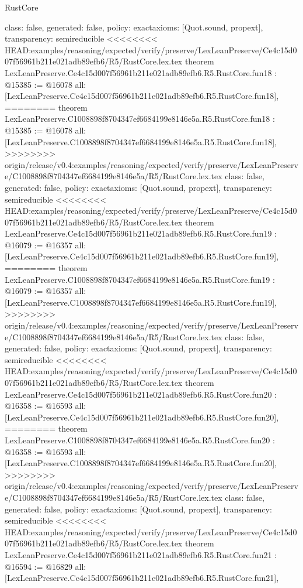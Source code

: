 \begin{lexlean}{RustCore}
\begin{coremodule}
{\begin{coremodule}
{{{{{{{{{{{{{{{{{{{{{  class: false,
  generated: false,
  policy: exact{axioms: [Quot.sound, propext]},
  transparency: semireducible
}
<<<<<<<< HEAD:examples/reasoning/expected/verify/preserve/LexLeanPreserve/Ce4c15d007f56961b211e021adb89efb6/R5/RustCore.lex.tex
theorem LexLeanPreserve.Ce4c15d007f56961b211e021adb89efb6.R5.RustCore.fun18 : @15385 := @16078 {
  all: [LexLeanPreserve.Ce4c15d007f56961b211e021adb89efb6.R5.RustCore.fun18],
========
theorem LexLeanPreserve.C1008898f8704347ef6684199e8146e5a.R5.RustCore.fun18 : @15385 := @16078 {
  all: [LexLeanPreserve.C1008898f8704347ef6684199e8146e5a.R5.RustCore.fun18],
>>>>>>>> origin/release/v0.4:examples/reasoning/expected/verify/preserve/LexLeanPreserve/C1008898f8704347ef6684199e8146e5a/R5/RustCore.lex.tex
  class: false,
  generated: false,
  policy: exact{axioms: [Quot.sound, propext]},
  transparency: semireducible
}
<<<<<<<< HEAD:examples/reasoning/expected/verify/preserve/LexLeanPreserve/Ce4c15d007f56961b211e021adb89efb6/R5/RustCore.lex.tex
theorem LexLeanPreserve.Ce4c15d007f56961b211e021adb89efb6.R5.RustCore.fun19 : @16079 := @16357 {
  all: [LexLeanPreserve.Ce4c15d007f56961b211e021adb89efb6.R5.RustCore.fun19],
========
theorem LexLeanPreserve.C1008898f8704347ef6684199e8146e5a.R5.RustCore.fun19 : @16079 := @16357 {
  all: [LexLeanPreserve.C1008898f8704347ef6684199e8146e5a.R5.RustCore.fun19],
>>>>>>>> origin/release/v0.4:examples/reasoning/expected/verify/preserve/LexLeanPreserve/C1008898f8704347ef6684199e8146e5a/R5/RustCore.lex.tex
  class: false,
  generated: false,
  policy: exact{axioms: [Quot.sound, propext]},
  transparency: semireducible
}
<<<<<<<< HEAD:examples/reasoning/expected/verify/preserve/LexLeanPreserve/Ce4c15d007f56961b211e021adb89efb6/R5/RustCore.lex.tex
theorem LexLeanPreserve.Ce4c15d007f56961b211e021adb89efb6.R5.RustCore.fun20 : @16358 := @16593 {
  all: [LexLeanPreserve.Ce4c15d007f56961b211e021adb89efb6.R5.RustCore.fun20],
========
theorem LexLeanPreserve.C1008898f8704347ef6684199e8146e5a.R5.RustCore.fun20 : @16358 := @16593 {
  all: [LexLeanPreserve.C1008898f8704347ef6684199e8146e5a.R5.RustCore.fun20],
>>>>>>>> origin/release/v0.4:examples/reasoning/expected/verify/preserve/LexLeanPreserve/C1008898f8704347ef6684199e8146e5a/R5/RustCore.lex.tex
  class: false,
  generated: false,
  policy: exact{axioms: [Quot.sound, propext]},
  transparency: semireducible
}
<<<<<<<< HEAD:examples/reasoning/expected/verify/preserve/LexLeanPreserve/Ce4c15d007f56961b211e021adb89efb6/R5/RustCore.lex.tex
theorem LexLeanPreserve.Ce4c15d007f56961b211e021adb89efb6.R5.RustCore.fun21 : @16594 := @16829 {
  all: [LexLeanPreserve.Ce4c15d007f56961b211e021adb89efb6.R5.RustCore.fun21],
}}}}}}}}}}}}}}}}}}}}}}}}
\end{coremodule}}
\end{coremodule}
\end{lexlean}

